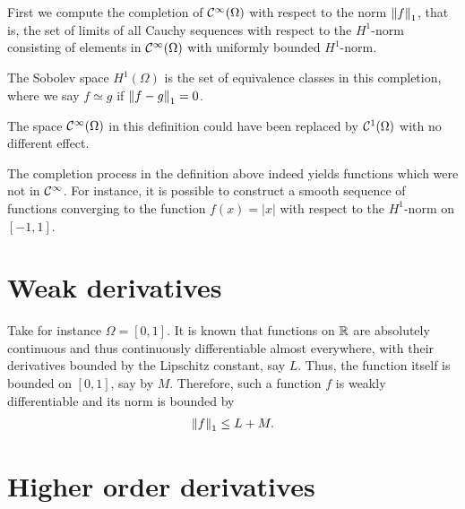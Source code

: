 \begin{definition}
  First we compute the completion of
  $\mathcal C^\infty(\Omega)$ with respect to the norm $\left\|f\right\|_1$, that is,
  the set of limits of all Cauchy sequences with respect to the
  $H^1$-norm consisting of elements in $\mathcal C^\infty(\Omega)$ with
  uniformly bounded $H^1$-norm.
  
  The Sobolev space $H^1(\Omega)$ is the set of equivalence classes in
  this completion, where we say $f\simeq g$ if $\left\|f-g\right\|_1=0$.
\end{definition}

\begin{note}
  The space $\mathcal C^\infty(\Omega)$ in this definition could have been
  replaced by $\mathcal C^1(\Omega)$ with no different effect.
\end{note}

\begin{example}
  The completion process in the definition above indeed yields
  functions which were not in $\mathcal C^\infty$. For instance, it is
  possible to construct a smooth sequence of functions converging to
  the function $f(x) = |x|$ with respect to the $H^1$-norm on $[-1,1]$.
\end{example}

\section{Weak derivatives}
\label{sec:weak-derivatives}

\begin{example}
   Take for instance $\Omega
  = [0,1]$. It is known that 
  functions on $\mathbb R$ are absolutely continuous and thus continuously
  differentiable almost everywhere, with their derivatives bounded by
  the Lipschitz constant, say $L$. Thus, the function itself is
  bounded on $[0,1]$, say by $M$. Therefore, such a function $f$ is
  weakly differentiable and its norm is bounded by
  \begin{gather*}
    \left\|f\right\|_1 \le L+M.
  \end{gather*}
\end{example}

\section{Higher order derivatives}
\label{sec:higher-derivatives}


